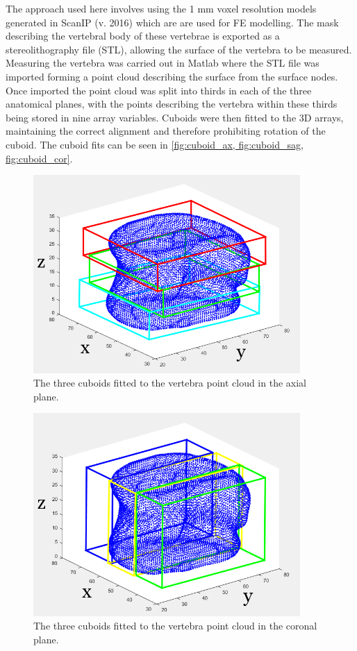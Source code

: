 The approach used here involves using the 1 mm voxel resolution models generated in ScanIP (v. 2016) which are are used for FE modelling.
The mask describing the vertebral body of these vertebrae is exported as a stereolithography file (STL), allowing the surface of the vertebra to be measured.
Measuring the vertebra was carried out in Matlab where the STL file was imported forming a point cloud describing the surface from the surface nodes.
Once imported the point cloud was split into thirds in each of the three anatomical planes, with the points describing the vertebra within these thirds being stored in nine array variables.
Cuboids were then fitted to the 3D arrays, maintaining the correct alignment and therefore prohibiting rotation of the cuboid.
The cuboid fits can be seen in \cref{fig:cuboid_ax, fig:cuboid_sag, fig:cuboid_cor}.


\begin{figure}[ht!]
  \centering
  \includegraphics[width=4in]{Chapters/Chapter_PCA_images/Cuboid_fit_axial.png}
  \caption{The three cuboids fitted to the vertebra point cloud in the axial plane.}
  \label{fig:cuboid_ax}
\end{figure}

\begin{figure}[ht!]
  \centering
  \includegraphics[width=4in]{Chapters/Chapter_PCA_images/Cuboid_fit_coronal.png}
  \caption{The three cuboids fitted to the vertebra point cloud in the coronal plane.}
  \label{fig:cuboid_cor}
\end{figure}

